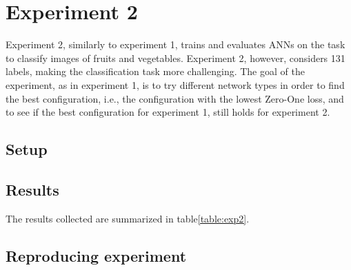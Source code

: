 \section{Experiment 2}
\label{sec:exp2}
Experiment 2, similarly to experiment 1, trains and evaluates ANNs on the task to classify images of fruits and vegetables. Experiment 2, however, considers 131 labels, making the classification task more challenging. The goal of the experiment, as in experiment 1, is to try different network types in order to find the best configuration, i.e., the configuration with the lowest Zero-One loss, and to see if the best configuration for experiment 1, still holds for experiment 2.
\subsection{Setup}
\subsection{Results}
The results collected are summarized in table\ref{table:exp2}.

\subsection{Reproducing experiment}
